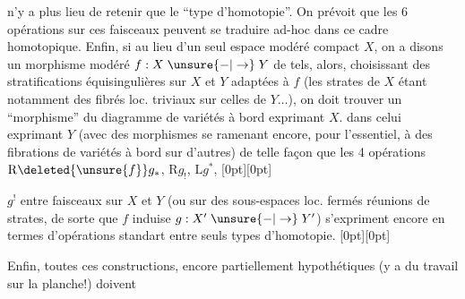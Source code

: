 %
n'y a plus lieu de retenir que le ``type d'homotopie''. On prévoit que les 6 opérations sur ces faisceaux peuvent se traduire ad-hoc dans ce cadre homotopique. Enfin, si au lieu d'un seul espace modéré compact $X$, on a disons un morphisme modéré $f:X\mathrel{\unsure{-|\to}}Y$ de tels, alors, choisissant des stratifications équisingulières sur $X$ et $Y$ adaptées à $f$ (les strates de $X$ étant notamment des fibrés loc. triviaux sur celles de $Y\ldots$), on doit trouver un ``morphisme'' du diagramme de variétés à bord exprimant $X$. dans celui exprimant $Y$
(avec des morphismes  se ramenant  encore, pour l'essentiel, à des fibrations de variétés à bord sur d'autres) de telle façon que les 4 opérations $\mathrm{R}\deleted{\unsure{f}}g_*$, $\mathrm{R}g_!$, $\mathrm{L}g^*$,
\raisebox{-2ex}[0pt][0pt]{\parbox[t]{0pt}{}}%
$g^!$ entre faisceaux  sur $X$ et $Y$ (ou sur des sous-espaces loc. fermés  réunions de strates, de sorte que $f$ induise $g:X'\mathrel{\unsure{-|\to}}Y'$) s'expriment encore en termes d'opérations standart entre seuls types d'homotopie.
\raisebox{2.5ex}[0pt][0pt]{\parbox[t]{0pt}{}}%
Enfin, toutes ces constructions, encore partiellement hypothétiques (y a du travail  sur la planche!) doivent
